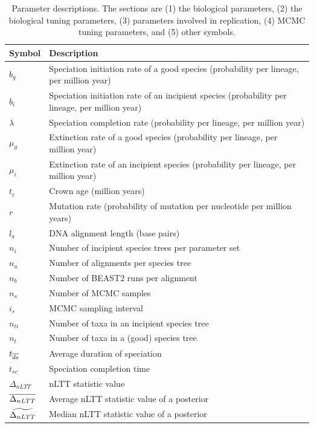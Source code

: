 \documentclass{article}
\begin{document}
\begin{table}
  \centering 
  \begin{tabular}{l l}
    \hline
    Symbol & Description \\
    \hline
    \hline
    $b_g$ & Speciation initiation rate of a good species (probability per lineage, per million year) \\
    $b_i$ & Speciation initiation rate of an incipient species (probability per lineage, per million year) \\
    $\lambda$ & Speciation completion rate (probability per lineage, per million year) \\
    $\mu_g$ & Extinction rate of a good species (probability per lineage, per million year) \\
    $\mu_i$ & Extinction rate of an incipient species (probability per lineage, per million year) \\
    \hline
    $t_c$ & Crown age (million years) \\
    $r$ & Mutation rate (probability of mutation per nucleotide per million years) \\
    $l_a$ & DNA alignment length (base pairs) \\
    \hline
    $n_i$ & Number of incipient species trees per parameter set \\
    $n_a$ & Number of alignments per species tree \\
    $n_b$ & Number of BEAST2 runs per alignment \\
    \hline
    $n_s$ & Number of MCMC samples \\
    $i_s$ & MCMC sampling interval \\
    \hline
    $n_{ti}$ & Number of taxa in an incipient species tree \\
    $n_{t}$ & Number of taxa in a (good) species tree \\
    $t_{\overline{ds}}$ & Average duration of speciation \\
    $t_{sc}$ & Speciation completion time \\
    $\Delta_{nLTT}$ & nLTT statistic value \\
    $\overline{\Delta_{nLTT}}$ & Average nLTT statistic value of a posterior \\
    $\widetilde{\Delta_{nLTT}}$ & Median nLTT statistic value of a posterior \\
    \hline
  \end{tabular}
  \caption{
    Parameter descriptions. The sections are (1) the biological parameters, (2) the
    biological tuning parameters, (3) parameters involved in replication, (4) MCMC
    tuning parameters, and (5) other symbols.
  }
  \label{table:parameter_descriptions}
\end{table}
\end{document}
